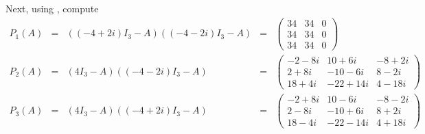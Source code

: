 \documentclass{ximera}
\begin{document}
Next, using \Matlabp, compute
\[
\begin{array}{rcccl}
P_1(A) & = & ((-4+2i)I_3-A)((-4-2i)I_3-A) & = & 
\left(\begin{array}{rrr}  
     34    &       34    &        0 \\     
     34    &       34    &        0 \\     
     34    &       34    &        0      
\end{array}\right) \\
P_2(A) & = & (4I_3-A)((-4-2i)I_3-A) & = &  
\left(\begin{array}{rrr}
     -2  - 8i     &   10  +  6i  &  -8  +  2i \\     
      2  + 8i     &  -10  -  6i  &   8  -  2i \\     
     18  + 4i     &  -22  + 14i  &   4  - 18i       
\end{array}\right) \\
P_3(A) & = & (4I_3-A)((-4+2i)I_3-A) & = & 
\left(\begin{array}{rrr}
     -2  + 8i     &   10  -  6i  &  -8  -  2i \\      
      2  - 8i     &  -10  +  6i  &   8  +  2i \\   
     18  - 4i     &  -22  - 14i  &   4  + 18i    
\end{array}\right)
\end{array}
\]
\end{document}
